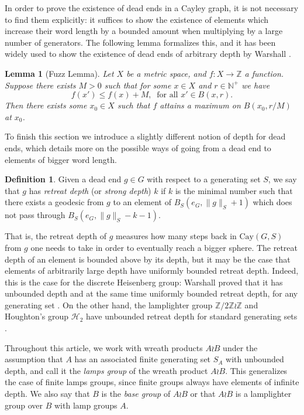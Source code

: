 \documentclass[reqno,oneside]{amsart}
\newcommand{\cay}[2]{\mathrm{Cay}(#1,#2)}
\newcommand{\Z}{\mathbb{Z}}
\theoremstyle{plain}
\newtheorem{lem}[thm]{Lemma}
\theoremstyle{definition}
\newtheorem{defn}[thm]{Definition} %
\begin{document}
In order to prove the existence of dead ends in a Cayley graph, it is not necessary to find them explicitly: it suffices to show the existence of elements which increase their word length by a bounded amount when multiplying by a large number of generators. The following lemma formalizes this, and it has been widely used to show the existence of dead ends of arbitrary depth by Warshall \cite{warshall2008strongly,warshall2010deep,warshall2011group}.


\begin{lem}[Fuzz Lemma]\label{lem: Fuzz Lemma}
	Let $X$ be a metric space, and $f:X\to \mathbb{Z}$ a function. Suppose there exists $M> 0$ such that for some $x\in X$ and $r\in \mathbb{N}^{+}$ we have
	\begin{equation*}\label{eq: condition for Fuzz lemma}
	f(x')\le f(x)+M, \ \text{ for all }x'\in B(x,r).
	\end{equation*}
	Then there exists some $x_0\in X$ such that $f$ attains a maximum on $B(x_0,r/M)$ at $x_0$.
\end{lem}

To finish this section we introduce a slightly different notion of depth for dead ends, which details more on the possible ways of going from a dead end to elements of bigger word length. 
\begin{defn}\label{def: retreat depth}
	Given a dead end $g\in G$ with respect to a generating set $S$, we say that $g$ has \textit{retreat depth} (or \textit{strong depth}) $k$ if $k$ is the minimal number such that there exists a geodesic from $g$ to an element of $B_S(e_G,\|g\|_{S}+1)$ which does not pass through $B_S(e_G,\|g\|_{S}-k-1)$.
\end{defn} That is, the retreat depth of $g$ measures how many steps back in $\cay{G}{S}$ from $g$ one needs to take in order to eventually reach a bigger sphere. The retreat depth of an element is bounded above by its depth, but it may be the case that elements of arbitrarily large depth have uniformly bounded retreat depth. Indeed, this is the case for the discrete Heisenberg group: Warshall proved that it has unbounded depth and at the same time uniformly bounded retreat depth, for any generating set \cite{warshall2011group}. On the other hand, the lamplighter group $\Z/2\Z\wr\Z$ and Houghton's group $\mathcal{H}_2$ have unbounded retreat depth for standard generating sets \cite{lehnert2009some}.


Throughout this article, we work with wreath products $A\wr B$ under the assumption that $A$ has an associated finite generating set $S_A$ with unbounded depth, and call it the \textit{lamps group} of the wreath product $A\wr B$. This generalizes the case of finite lamps groups, since finite groups always have elements of infinite depth. We also say that $B$ is the \textit{base group} of $A\wr B$ or that $A\wr B$ is a lamplighter group over $B$ with lamp groups $A$. 
\end{document}
